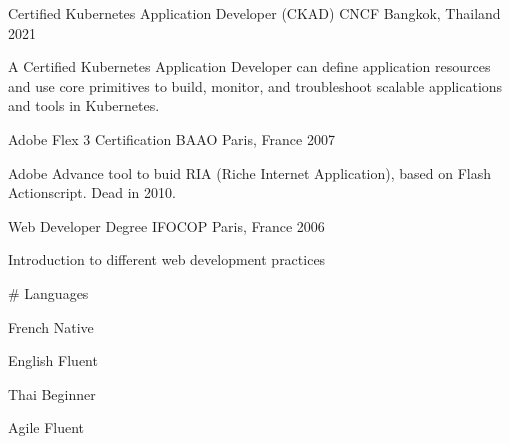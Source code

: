 

\begin{cventries}
  \cventry
    {Certified Kubernetes Application Developer (CKAD)} %
    {CNCF} %
    {Bangkok, Thailand} %
    {2021} %
    {
      \begin{cvitems} %
        \item {A Certified Kubernetes Application Developer can define application resources and use core primitives to build, monitor, and troubleshoot scalable applications and tools in Kubernetes.}
      \end{cvitems}
    }
    { } %

  \cventry
    {Adobe Flex 3 Certification} %
    {BAAO} %
    {Paris, France} %
    {2007} %
    {
      \begin{cvitems} %
        \item {Adobe Advance tool to buid RIA (Riche Internet Application), based on Flash Actionscript. Dead in 2010.}
      \end{cvitems}
    }
    { } %
  \cventry
    {Web Developer Degree} %
    {IFOCOP} %
    {Paris, France} %
    {2006} %
    {
      \begin{cvitems} %
        \item {Introduction to different web development practices}
      \end{cvitems}
    }
    { } %

  \cventry
    {} %
    {\# Languages} %
    { } %
    { } %
    {
      \begin{cvitems} %
        \item {French Native}
        \item {English Fluent}
        \item {Thai Beginner}
        \item {Agile Fluent}
      \end{cvitems}
    }
    { } %

\end{cventries}

